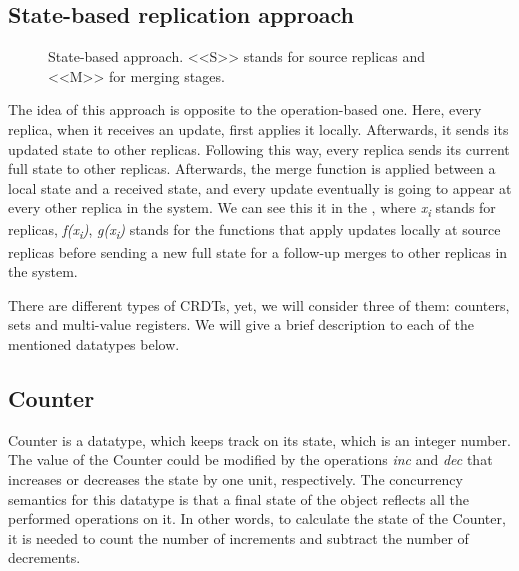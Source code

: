 
\subsection*{State-based replication approach}
\begin{figure}[!htb]
    \begin{center}
    \def\svgwidth{\linewidth}
    
    \caption {State-based approach\cite{2}. <<S>> stands for source replicas and <<M>> for merging stages.}
    \label{fig:theory2}
\end{center}
\end{figure}

The idea of this approach is opposite to the operation-based one. Here, every replica, when it receives an update, first applies it locally. Afterwards, it sends its updated state to other replicas. Following this way, every replica sends its current full state to other replicas. Afterwards, the merge function is applied between a local state and a received state, and every update eventually is going to appear at every other replica in the system. We can see this it in the , where \textit{x\textsubscript{i}} stands for replicas, \textit{f(x\textsubscript{i})}, \textit{g(x\textsubscript{i})} stands for the functions that apply updates locally at source replicas before sending a new full state for a follow-up merges to other replicas in the system.


There are different types of CRDTs, yet, we will consider three of them: counters, sets and multi-value registers. We will give a brief description to each of the mentioned datatypes below.

\subsection*{Counter}

Counter is a datatype, which keeps track on its state, which is an integer number. The value of the Counter could be modified by the operations \textit{inc} and \textit{dec} that increases or decreases the state by one unit, respectively\cite{3}. The concurrency semantics for this datatype is that a final state of the object reflects all the performed operations on it. In other words, to calculate the state of the Counter, it is needed to count the number of increments and subtract the number of decrements. 

